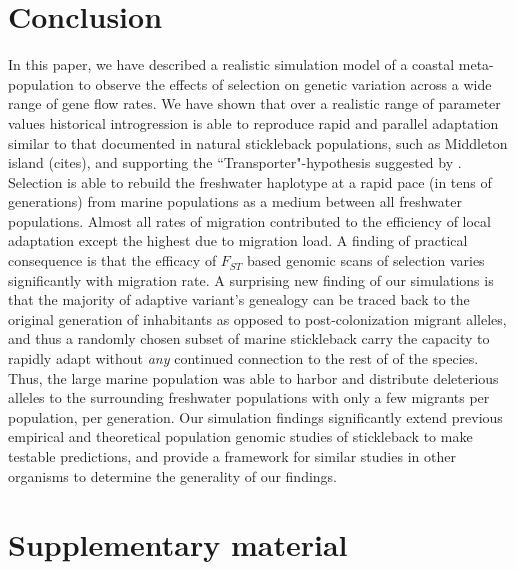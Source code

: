 \documentclass{article}
\begin{document}
\section*{Conclusion}

In this paper, we have described a realistic simulation model of a coastal meta-population to observe the effects of selection on genetic variation across a wide range of gene flow rates.
We have shown that over a realistic range of parameter values historical introgression is able to reproduce rapid and parallel adaptation similar to that documented in natural stickleback populations, such as Middleton island (cites), and supporting the ``Transporter"-hypothesis suggested by \citet{schluter2009genetics}.
Selection is able to rebuild the freshwater haplotype at a rapid pace (in tens of generations) from marine populations as a medium between all freshwater populations. 
Almost all rates of migration contributed to the efficiency of local adaptation except the highest due to migration load. A finding of practical consequence is that the efficacy of $F_{ST}$ based genomic scans of selection varies significantly with migration rate.
A surprising new finding of our simulations is that the majority of adaptive variant's genealogy can be traced back to the original generation of inhabitants as opposed to post-colonization migrant alleles, and thus a randomly chosen subset of marine stickleback carry the capacity to rapidly adapt without \emph{any} continued connection to the rest of of the species.
Thus, the large marine population was able to harbor and distribute deleterious alleles to the surrounding freshwater populations with only a few migrants per population, per generation. Our simulation findings significantly extend previous empirical and theoretical population genomic studies of stickleback to make testable predictions, and provide a framework for similar studies in other organisms to determine the generality of our findings.



{}

\clearpage
\appendix
\setcounter{table}{0}
\renewcommand{\thetable}{S\arabic{table}}
\setcounter{figure}{0}
\renewcommand{\thefigure}{S\arabic{figure}}

\section*{Supplementary material}
\end{document}
